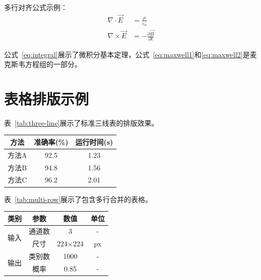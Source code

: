 多行对齐公式示例：
\begin{align}
    \nabla \cdot \vec{E} &= \frac{\rho}{\varepsilon_0} \label{eq:maxwell1} \\
    \nabla \times \vec{E} &= -\frac{\partial \vec{B}}{\partial t} \label{eq:maxwell2}
\end{align}

公式~\eqref{eq:integral}展示了微积分基本定理，公式~\eqref{eq:maxwell1}和\eqref{eq:maxwell2}是麦克斯韦方程组的一部分。

\section{表格排版示例}

表~\ref{tab:three-line}展示了标准三线表的排版效果。

\begin{heretab}
    \label{tab:three-line}
    \begin{tabular}{ccc}
        \toprule
        \textbf{方法} & \textbf{准确率(\%)} & \textbf{运行时间(s)} \\
        \midrule
        方法A & 92.5 & 1.23 \\
        方法B & 94.8 & 1.56 \\
        方法C & 96.2 & 2.01 \\
        \bottomrule
    \end{tabular}
\end{heretab}

表~\ref{tab:multi-row}展示了包含多行合并的表格。

\begin{heretab}
    \label{tab:multi-row}
    \begin{tabular}{cccc}
        \toprule
        \textbf{类别} & \textbf{参数} & \textbf{数值} & \textbf{单位} \\
        \midrule
        \multirow{2}{*}{输入} & 通道数 & 3 & - \\
                              & 尺寸 & 224$\times$224 & px \\
        \midrule
        \multirow{2}{*}{输出} & 类别数 & 1000 & - \\
                              & 概率 & 0.85 & - \\
        \bottomrule
    \end{tabular}
\end{heretab}

